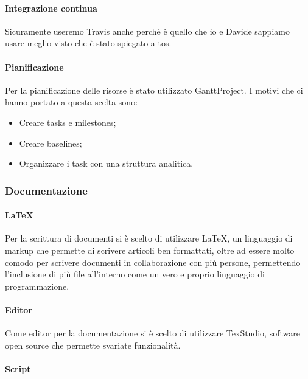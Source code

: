                         \paragraph{Integrazione continua}
                            Sicuramente useremo Travis anche perché è quello che io e Davide sappiamo usare meglio visto che è stato spiegato a tos.
                        \paragraph{Pianificazione}
                            Per la pianificazione delle risorse è stato utilizzato GanttProject. I motivi che ci hanno portato a questa scelta sono:
                            \begin{itemize}
                                \item Creare tasks e milestones;
                                \item Creare baselines;
                                \item Organizzare i task con una struttura analitica.
                            \end{itemize}
                        \subsubsection{Documentazione}
                        \paragraph{\LaTeX} 
                            Per la scrittura di documenti si è scelto di utilizzare \LaTeX, un linguaggio di markup che permette di scrivere articoli ben formattati, oltre ad essere molto comodo per scrivere documenti in collaborazione con più persone, permettendo l'inclusione di più file all'interno come un vero e proprio linguaggio di programmazione.
                        \newline
                        \paragraph{Editor}
                            Come editor per la documentazione si è scelto di utilizzare TexStudio, software open source che permette svariate funzionalità.
                        \paragraph{Script}
